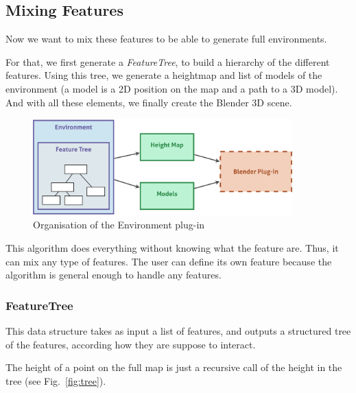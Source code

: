

\subsection{Mixing Features}
Now we want to mix these features to be able to generate full environments.

For that, we first generate a \textit{FeatureTree}, to build a hierarchy of the different features. Using this tree, we generate a heightmap and list of models of the environment (a model is a 2D position on the map and a path to a 3D model). And with all these elements, we finally create the Blender 3D scene.

\begin{figure}[h]
  \begin{center}
    \includegraphics[width=10cm]{img/env_global.pdf}
    \caption{Organisation of the Environment plug-in}
    \label{fig:env_global}
  \end{center}
\end{figure}

This algorithm does everything without knowing what the feature are. Thus, it can mix any type of features. The user can define its own feature because the algorithm is general enough to handle any features.


\subsubsection{FeatureTree}
This data structure takes as input a list of features, and outputs a structured tree of the features, according how they are suppose to interact. 

The height of a point on the full map is just a recursive call of the height in the tree (see Fig.~\ref{fig:tree}).

